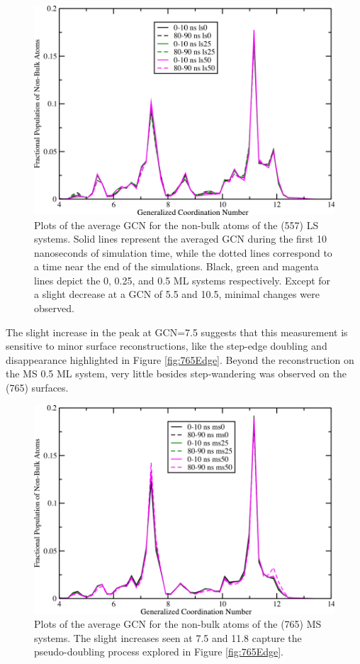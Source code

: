 \begin{figure}
\centering
\includegraphics[width=0.9\linewidth]{../figures/appB/557ls_GCNF.pdf}
\caption{Plots of the average GCN for the non-bulk atoms of the  (557)
LS systems. Solid lines represent the averaged GCN during the first 10
nanoseconds of simulation time, while the dotted lines correspond to a time
near the end of the simulations. Black, green and magenta lines depict the 0,
0.25, and 0.5 ML systems respectively. Except for a slight decrease at a GCN of 5.5 and
10.5, minimal changes were observed.}
\label{fig:557lsGCN}
\end{figure}
\newpage


The slight increase in the peak at GCN=7.5 suggests that this measurement is
sensitive to minor surface reconstructions, like the step-edge doubling and
disappearance highlighted in Figure \ref{fig:765Edge}. Beyond the
reconstruction on the MS 0.5 ML system, very little besides step-wandering was
observed on the (765) surfaces.

\begin{figure}
\centering
\includegraphics[width=0.9\linewidth]{../figures/appB/765ms_GCNF.pdf}
\caption{Plots of the average GCN for the non-bulk atoms of the  (765)
MS systems. The slight increases seen at 7.5 and 11.8 capture the
pseudo-doubling process explored in Figure \ref{fig:765Edge}.}
\label{fig:765msGCN}
\end{figure}
\newpage

